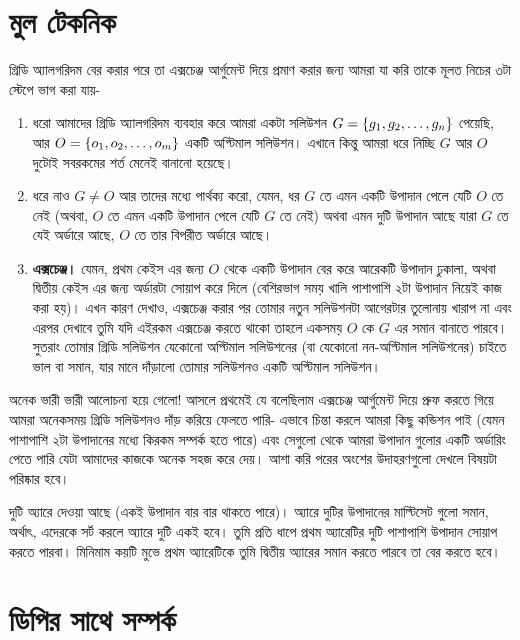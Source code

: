 \section{মুল টেকনিক}

গ্রিডি অ্যালগরিদম বের করার পরে তা এক্সচেঞ্জ আর্গুমেন্ট দিয়ে প্রমাণ করার জন্য আমরা যা করি তাকে মূলত নিচের ৩টা স্টেপে ভাগ করা যায়-
\begin{enumerate}
	\item ধরো আমাদের গ্রিডি অ্যালগরিদম ব্যবহার করে আমরা একটা সলিউশন $G = \left \{ g_1, g_2, \ldots, g_n \right \}$ পেয়েছি, আর $O = \left \{ o_1, o_2, \ldots, o_m \right \}$ একটি অপ্টিমাল সলিউশন।  এখানে কিন্তু আমরা ধরে নিচ্ছি $G$ আর $O$ দুটোই সবরকমের শর্ত মেনেই বানানো হয়েছে।
	\item ধরে নাও $G \not= O$ আর  তাদের মধ্যে পার্থক্য করো, যেমন, ধর $G$ তে এমন একটি উপাদান পেলে যেটি $O$ তে নেই (অথবা, $O$ তে এমন একটি উপাদান পেলে যেটি $G$ তে নেই) অথবা এমন দুটি উপাদান আছে যারা $G$ তে যেই অর্ডারে আছে, $O$ তে তার বিপরীত অর্ডারে আছে।
	\item \textbf{এক্সচেঞ্জ।} যেমন, প্রথম কেইস এর জন্য $O$ থেকে একটি উপাদান বের করে আরেকটি উপাদান ঢুকালা, অথবা দ্বিতীয় কেইস এর জন্য অর্ডারটা সোয়াপ করে দিলে (বেশিরভাগ সময় খালি পাশাপাশি ২টা উপাদান নিয়েই কাজ করা হয়)। এখন কারণ দেখাও, এক্সচেঞ্জ করার পর তোমার নতুন সলিউশনটা আগেরটার তুলোনায় খারাপ না এবং এরপর দেখাবে তুমি যদি এইরকম এক্সচেঞ্জ করতে থাকো তাহলে একসময় $O$ কে $G$ এর সমান বানাতে পারবে। সুতরাং তোমার গ্রিডি সলিউশন যেকোনো অপ্টিমাল সলিউশনের (বা যেকোনো নন-অপ্টিমাল সলিউশনের) চাইতে ভাল বা সমান, যার মানে দাঁড়ালো তোমার সলিউশনও একটি অপ্টিমাল সলিউশন।
\end{enumerate}

অনেক ভারী ভারী আলোচনা হয়ে গেলো! আসলে প্রথমেই যে বলেছিলাম এক্সচেঞ্জ আর্গুমেন্ট দিয়ে প্রুফ করতে গিয়ে আমরা অনেকসময় গ্রিডি সলিউশনও দাঁড় করিয়ে ফেলতে পারি- এভাবে চিন্তা করলে আমরা কিছু কন্ডিশন পাই (যেমন পাশাপাশি ২টা উপাদানের মধ্যে কিরকম সম্পর্ক হতে পারে) এবং সেগুলো থেকে আমরা উপাদান গুলোর একটি অর্ডারিং পেতে পারি যেটা আমাদের কাজকে অনেক সহজ করে দেয়। আশা করি পরের অংশের উদাহরণগুলো দেখলে বিষয়টা পরিষ্কার হবে।

\begin{exercise}
দুটি অ্যারে দেওয়া আছে (একই উপাদান বার বার থাকতে পারে)। অ্যারে দুটির উপাদানের মাল্টিসেট গুলো সমান, অর্থাৎ, এদেরকে সর্ট করলে অ্যারে দুটি একই হবে। তুমি প্রতি ধাপে প্রথম অ্যারেটির দুটি পাশাপাশি উপাদান সোয়াপ করতে পারবা। মিনিমাম কয়টি মুভে প্রথম অ্যারেটিকে তুমি দ্বিতীয় অ্যারের সমান করতে পারবে তা বের করতে হবে।
\end{exercise}

\section{ডিপির সাথে সম্পর্ক}

